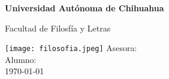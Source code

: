 \begin{titlepage}
    \begin{center}
        \vspace*{1cm}

        \Huge
        \textbf{Universidad Autónoma de Chihuahua}

        \vspace{0.5cm}
        \LARGE
        Facultad de Filosfía y Letras

        \vspace{1.5cm}

        \textbf{\titleName}

        \vspace{0.8cm}

        \texttt{[image: filosofia.jpeg]}
        \vfill
        \Large
        Asesora: \asesorName\\
        Alumno: \authorName\\
        \today

    \end{center}
\end{titlepage}
